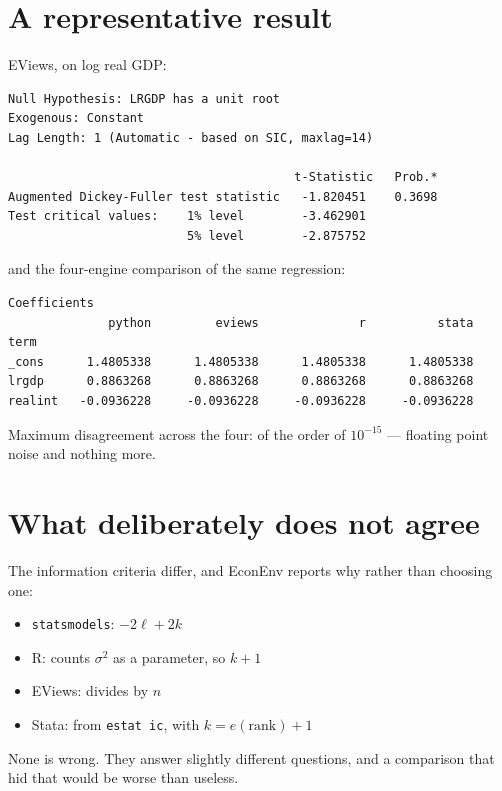 \documentclass[11pt,a4paper]{report}
\begin{document}
\section{A representative result}

EViews, on log real GDP:

\begin{lstlisting}
Null Hypothesis: LRGDP has a unit root
Exogenous: Constant
Lag Length: 1 (Automatic - based on SIC, maxlag=14)

                                        t-Statistic   Prob.*
Augmented Dickey-Fuller test statistic   -1.820451    0.3698
Test critical values:    1% level        -3.462901
                         5% level        -2.875752
\end{lstlisting}

and the four-engine comparison of the same regression:

\begin{lstlisting}
Coefficients
              python         eviews              r          stata
term
_cons      1.4805338      1.4805338      1.4805338      1.4805338
lrgdp      0.8863268      0.8863268      0.8863268      0.8863268
realint   -0.0936228     -0.0936228     -0.0936228     -0.0936228
\end{lstlisting}

Maximum disagreement across the four: of the order of $10^{-15}$ --- floating
point noise and nothing more.

\section{What deliberately does not agree}

The information criteria differ, and EconEnv reports why rather than choosing
one:

\begin{itemize}
  \item \texttt{statsmodels}: $-2\ell + 2k$
  \item R: counts $\sigma^2$ as a parameter, so $k+1$
  \item EViews: divides by $n$
  \item Stata: from \texttt{estat ic}, with $k = e(\text{rank}) + 1$
\end{itemize}

None is wrong. They answer slightly different questions, and a comparison that
hid that would be worse than useless.

\end{document}
